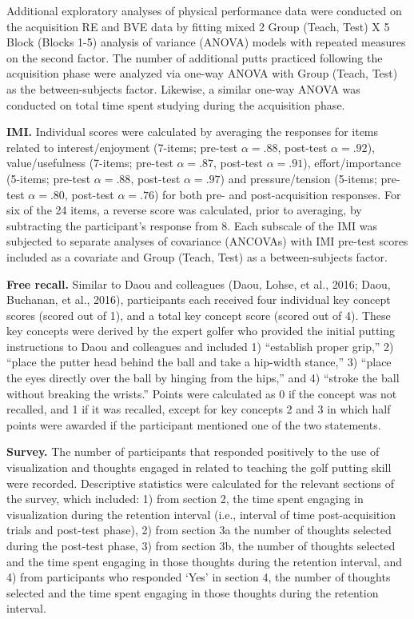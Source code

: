 \documentclass[
  english,
  man,floatsintext]{apa7}
\begin{document}
Additional exploratory analyses of physical performance data were conducted on the acquisition RE and BVE data by fitting mixed 2 Group (Teach, Test) X 5 Block (Blocks 1-5) analysis of variance (ANOVA) models with repeated measures on the second factor. The number of additional putts practiced following the acquisition phase were analyzed via one-way ANOVA with Group (Teach, Test) as the between-subjects factor. Likewise, a similar one-way ANOVA was conducted on total time spent studying during the acquisition phase.

\textbf{IMI.} Individual scores were calculated by averaging the responses for items related to interest/enjoyment (7-items; pre-test \(\alpha = .88\), post-test \(\alpha = .92\)), value/usefulness (7-items; pre-test \(\alpha = .87\), post-test \(\alpha = .91\)), effort/importance (5-items; pre-test \(\alpha = .88\), post-test \(\alpha = .97\)) and pressure/tension (5-items; pre-test \(\alpha = .80\), post-test \(\alpha = .76\)) for both pre- and post-acquisition responses. For six of the 24 items, a reverse score was calculated, prior to averaging, by subtracting the participant's response from 8. Each subscale of the IMI was subjected to separate analyses of covariance (ANCOVAs) with IMI pre-test scores included as a covariate and Group (Teach, Test) as a between-subjects factor.

\textbf{Free recall.} Similar to Daou and colleagues (Daou, Lohse, et al., 2016; Daou, Buchanan, et al., 2016), participants each received four individual key concept scores (scored out of 1), and a total key concept score (scored out of 4). These key concepts were derived by the expert golfer who provided the initial putting instructions to Daou and colleagues and included 1) ``establish proper grip,'' 2) ``place the putter head behind the ball and take a hip-width stance,'' 3) ``place the eyes directly over the ball by hinging from the hips,'' and 4) ``stroke the ball without breaking the wrists.'' Points were calculated as 0 if the concept was not recalled, and 1 if it was recalled, except for key concepts 2 and 3 in which half points were awarded if the participant mentioned one of the two statements.

\textbf{Survey.} The number of participants that responded positively to the use of visualization and thoughts engaged in related to teaching the golf putting skill were recorded. Descriptive statistics were calculated for the relevant sections of the survey, which included: 1) from section 2, the time spent engaging in visualization during the retention interval (i.e., interval of time post-acquisition trials and post-test phase), 2) from section 3a the number of thoughts selected during the post-test phase, 3) from section 3b, the number of thoughts selected and the time spent engaging in those thoughts during the retention interval, and 4) from participants who responded `Yes' in section 4, the number of thoughts selected and the time spent engaging in those thoughts during the retention interval.
\end{document}
